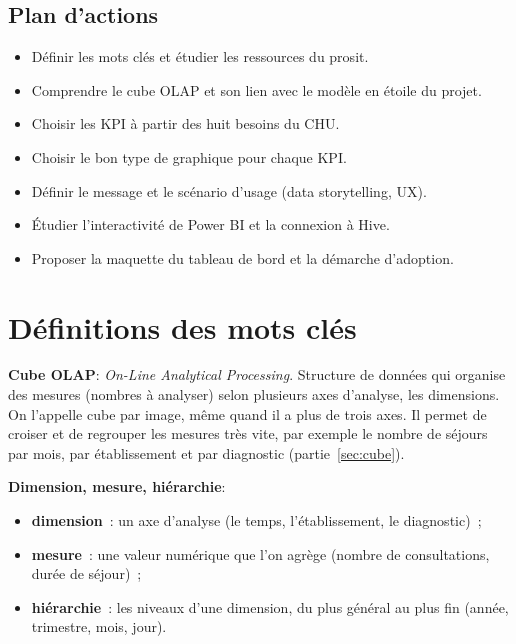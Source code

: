 \subsection*{Plan d'actions}
{}
\begin{itemize}
	\item Définir les mots clés et étudier les ressources du prosit.
	\item Comprendre le cube OLAP et son lien avec le modèle en étoile du projet.
	\item Choisir les KPI à partir des huit besoins du CHU.
	\item Choisir le bon type de graphique pour chaque KPI.
	\item Définir le message et le scénario d'usage (data storytelling, UX).
	\item Étudier l'interactivité de Power BI et la connexion à Hive.
	\item Proposer la maquette du tableau de bord et la démarche d'adoption.
\end{itemize}

\newpage
\section{Définitions des mots clés}

\noindent \textbf{Cube OLAP}:
\noindent \textit{On-Line Analytical Processing}. Structure de données qui organise des mesures (nombres à analyser) selon plusieurs axes d'analyse, les dimensions. On l'appelle \og cube\fg{} par image, même quand il a plus de trois axes. Il permet de croiser et de regrouper les mesures très vite, par exemple le nombre de séjours par mois, par établissement et par diagnostic (partie~\ref{sec:cube}).

\separateur

\noindent \textbf{Dimension, mesure, hiérarchie}:
\begin{itemize}
	\item \textbf{dimension}~: un axe d'analyse (le temps, l'établissement, le diagnostic)~;
	\item \textbf{mesure}~: une valeur numérique que l'on agrège (nombre de consultations, durée de séjour)~;
	\item \textbf{hiérarchie}~: les niveaux d'une dimension, du plus général au plus fin (année, trimestre, mois, jour).
\end{itemize}

